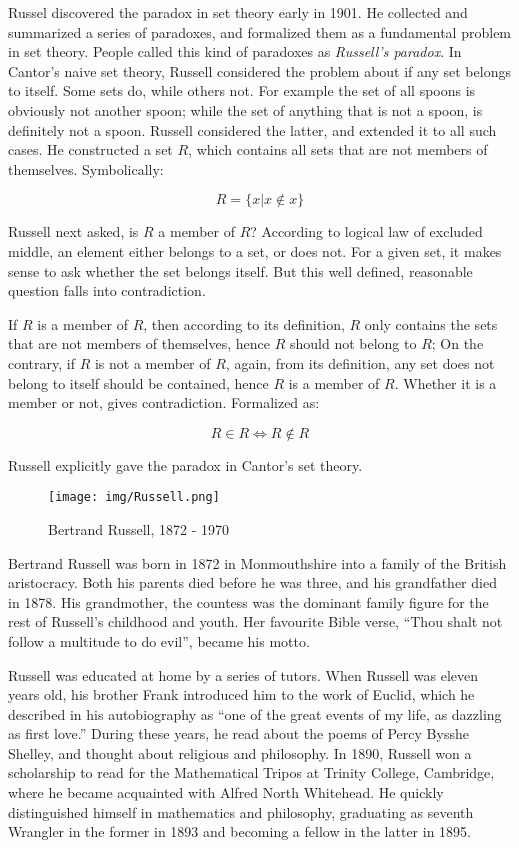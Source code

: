 \documentclass[b5paper]{article}
\begin{document}
Russel discovered the paradox in set theory early in 1901. He collected and summarized a series of paradoxes, and formalized them as a fundamental problem in set theory. People called this kind of paradoxes as {\em Russell's paradox}. In Cantor's naive set theory, Russell considered the problem about if any set belongs to itself. Some sets do, while others not. For example the set of all spoons is obviously not another spoon; while the set of anything that is not a spoon, is definitely not a spoon. Russell considered the latter, and extended it to all such cases. He constructed a set $R$, which contains all sets that are not members of themselves. Symbolically:

\[
R = \{ x | x \notin x \}
\]

Russell next asked, is $R$ a member of $R$? According to logical law of excluded middle, an element either belongs to a set, or does not. For a given set, it makes sense to ask whether the set belongs itself. But this well defined, reasonable question falls into contradiction.

If $R$ is a member of $R$, then according to its definition, $R$ only contains the sets that are not members of themselves, hence $R$ should not belong to $R$; On the contrary, if $R$ is not a member of $R$, again, from its definition, any set does not belong to itself should be contained, hence $R$ is a member of $R$. Whether it is a member or not, gives contradiction. Formalized as:

\[
R \in R \iff R \notin R
\]

Russell explicitly gave the paradox in Cantor's set theory.

\vspace{5mm}

\begin{wrapfigure}{R}{0.3\textwidth}
 \centering
 \texttt{[image: img/Russell.png]}
 \captionsetup{labelformat=empty}
 \caption{Bertrand Russell, 1872 - 1970}
 \label{fig:Russell}
\end{wrapfigure}

Bertrand Russell was born in 1872 in Monmouthshire into a family of the British aristocracy. Both his parents died before he was three, and his grandfather died in 1878. His grandmother, the countess was the dominant family figure for the rest of Russell's childhood and youth. Her favourite Bible verse, ``Thou shalt not follow a multitude to do evil'', became his motto.

Russell was educated at home by a series of tutors. When Russell was eleven years old, his brother Frank introduced him to the work of Euclid, which he described in his autobiography as ``one of the great events of my life, as dazzling as first love.'' During these years, he read about the poems of Percy Bysshe Shelley, and thought about religious and philosophy. In 1890, Russell won a scholarship to read for the Mathematical Tripos at Trinity College, Cambridge, where he became acquainted with Alfred North Whitehead. He quickly distinguished himself in mathematics and philosophy, graduating as seventh Wrangler in the former in 1893 and becoming a fellow in the latter in 1895.
\end{document}
